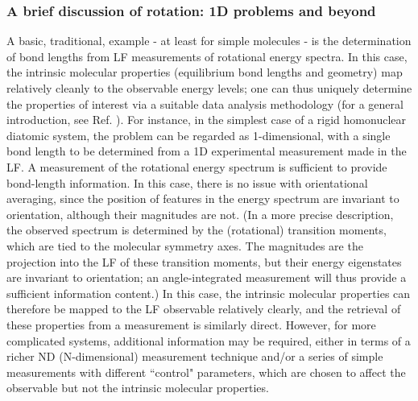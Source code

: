 \documentclass[10pt]{article}
\begin{document}
\subsubsection{A brief discussion of rotation: 1D problems and beyond\label{sec:1D-case}}

A basic, traditional, example - at least for simple molecules - is the determination of bond lengths from LF measurements of rotational energy spectra. In this case, the intrinsic molecular properties (equilibrium bond lengths and geometry) map relatively cleanly to the observable energy levels; one can thus uniquely determine the properties of interest via a suitable data analysis methodology (for a general introduction, see Ref. \cite{hollasHighRes}). For instance, in the simplest case of a rigid homonuclear diatomic system, the problem can be regarded as 1-dimensional, with a single bond length to be determined from a 1D experimental measurement made in the LF. A measurement of the rotational energy spectrum is sufficient to provide bond-length information. In this case, there is no issue with orientational averaging, since the position of features in the energy spectrum are invariant to orientation, although their magnitudes are not. 
(In a more precise description, the observed spectrum is determined by the (rotational) transition moments, which are tied to the molecular symmetry axes. The magnitudes are the projection into the LF of these transition moments, but their energy eigenstates are invariant to orientation; an angle-integrated measurement will thus provide a sufficient information content.)
In this case, the intrinsic molecular properties can therefore be mapped to the LF observable relatively clearly, and the retrieval of these properties from a measurement is similarly direct. However, for more complicated systems, additional information may be required, either in terms of a richer ND (N-dimensional) measurement technique and/or a series of simple measurements with different ``control" parameters, which are chosen to affect the observable but not the intrinsic molecular properties.

\end{document}
